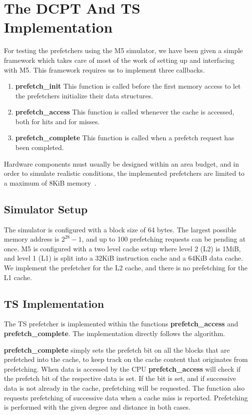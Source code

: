 \section{The DCPT And TS Implementation}
\label{section:scheme}

For testing the prefetchers using the M5 simulator, we have been given a simple
framework which takes care of most of the work of setting up and interfacing with
M5. This framework requires us to implement three callbacks.

\begin{enumerate}
	\item \textbf{prefetch\_init}
		This function is called before the first memory access to let the
		prefetchers initialize their data structures.
	\item \textbf{prefetch\_access}
		This function is called whenever the cache is accessed, both for hits
		and for misses.
	\item \textbf{prefetch\_complete}
		This function is called when a prefetch request has been completed.
\end{enumerate}

Hardware components must usually be designed within an area budget, and in order
to simulate realistic conditions, the implemented prefetchers are limited to a
maximum of 8KiB memory~\cite{guidelines}.

\subsection{Simulator Setup}

The simulator is configured with a block size of 64 bytes. The largest possible
memory address is $2^{28}-1$, and up to 100 prefetching requests can be pending
at once. M5 is configured with a two level cache setup where level 2 (L2) is 1MiB, 
and level 1 (L1) is split into a 32KiB instruction cache and a 64KiB data
cache. We implement the prefetcher for the L2 cache, and there is no prefetching 
for the L1 cache. 

\subsection{TS Implementation}

The TS prefetcher is implemented within the functions \textbf{prefetch\_access}
and \textbf{prefetch\_complete}. The implementation directly follows the
algorithm. 

\textbf{prefetch\_complete} simply sets the prefetch bit on all the blocks that
are prefetched into the cache, to keep track on the cache content that
originates from prefetching. When data is accessed by the CPU
\textbf{prefetch\_access} will check if the prefetch bit of the respective data
is set. If the bit is set, and if successive data is not already in the cache,
prefetching will be requested. The function also requests prefetching of successive 
data when a cache miss is
reported. Prefetching is performed with the given degree and distance in both
cases.

